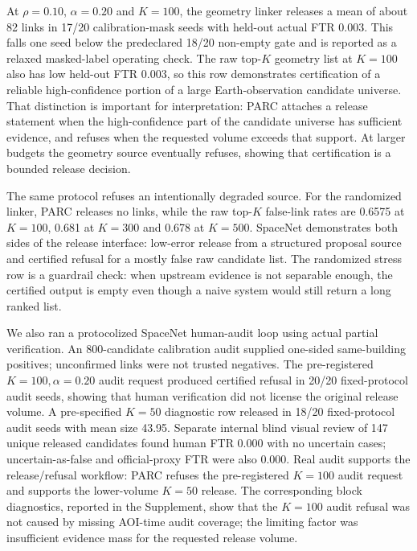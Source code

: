\documentclass[10pt,twocolumn]{article}
\begin{document}
At \(\rho=0.10\), \(\alpha=0.20\) and \(K=100\), the geometry linker releases a mean of about 82 links in 17/20 calibration-mask seeds with held-out actual FTR 0.003.
This falls one seed below the predeclared 18/20 non-empty gate and is reported as a relaxed masked-label operating check.
The raw top-\(K\) geometry list at \(K=100\) also has low held-out FTR 0.003, so this row demonstrates certification of a reliable high-confidence portion of a large Earth-observation candidate universe.
That distinction is important for interpretation: PARC attaches a release statement when the high-confidence part of the candidate universe has sufficient evidence, and refuses when the requested volume exceeds that support.
At larger budgets the geometry source eventually refuses, showing that certification is a bounded release decision.

The same protocol refuses an intentionally degraded source.
For the randomized linker, PARC releases no links, while the raw top-\(K\) false-link rates are 0.6575 at \(K=100\), 0.681 at \(K=300\) and 0.678 at \(K=500\).
SpaceNet demonstrates both sides of the release interface: low-error release from a structured proposal source and certified refusal for a mostly false raw candidate list.
The randomized stress row is a guardrail check: when upstream evidence is not separable enough, the certified output is empty even though a naive system would still return a long ranked list.

We also ran a protocolized SpaceNet human-audit loop using actual partial verification.
An 800-candidate calibration audit supplied one-sided same-building positives; unconfirmed links were not trusted negatives.
The pre-registered \(K=100,\alpha=0.20\) audit request produced certified refusal in 20/20 fixed-protocol audit seeds, showing that human verification did not license the original release volume.
A pre-specified \(K=50\) diagnostic row released in 18/20 fixed-protocol audit seeds with mean size 43.95.
Separate internal blind visual review of 147 unique released candidates found human FTR 0.000 with no uncertain cases; uncertain-as-false and official-proxy FTR were also 0.000.
Real audit supports the release/refusal workflow: PARC refuses the pre-registered \(K=100\) audit request and supports the lower-volume \(K=50\) release.
The corresponding block diagnostics, reported in the Supplement, show that the \(K=100\) audit refusal was not caused by missing AOI-time audit coverage; the limiting factor was insufficient evidence mass for the requested release volume.
\end{document}
